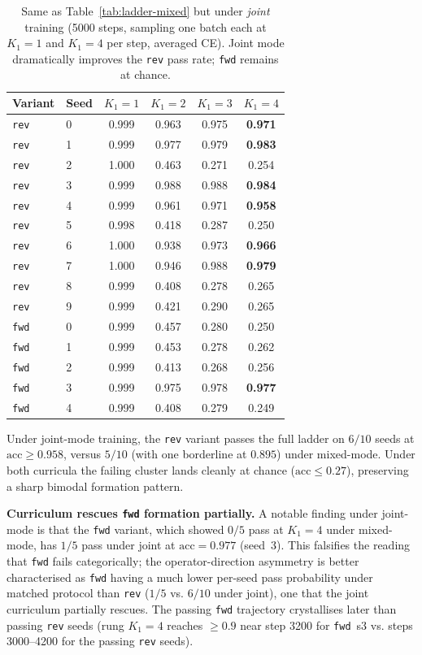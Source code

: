 \documentclass[11pt]{article}
\newcommand{\claim}[1]{#1}
\begin{document}
\begin{table}[h]
\centering
\caption{Same as Table~\ref{tab:ladder-mixed} but under \emph{joint}
training (5000 steps, sampling one batch each at $K_1{=}1$ and $K_1{=}4$
per step, averaged CE). Joint mode dramatically improves the \texttt{rev}
pass rate; \texttt{fwd} remains at chance.}
\label{tab:ladder-joint}
\begin{tabular}{llcccc}
\toprule
Variant & Seed & $K_1 = 1$ & $K_1 = 2$ & $K_1 = 3$ & $K_1 = 4$ \\
\midrule
\texttt{rev} & 0 & 0.999 & 0.963 & 0.975 & \textbf{0.971} \\
\texttt{rev} & 1 & 0.999 & 0.977 & 0.979 & \textbf{0.983} \\
\texttt{rev} & 2 & 1.000 & 0.463 & 0.271 & 0.254 \\
\texttt{rev} & 3 & 0.999 & 0.988 & 0.988 & \textbf{0.984} \\
\texttt{rev} & 4 & 0.999 & 0.961 & 0.971 & \textbf{0.958} \\
\texttt{rev} & 5 & 0.998 & 0.418 & 0.287 & 0.250 \\
\texttt{rev} & 6 & 1.000 & 0.938 & 0.973 & \textbf{0.966} \\
\texttt{rev} & 7 & 1.000 & 0.946 & 0.988 & \textbf{0.979} \\
\texttt{rev} & 8 & 0.999 & 0.408 & 0.278 & 0.265 \\
\texttt{rev} & 9 & 0.999 & 0.421 & 0.290 & 0.265 \\
\midrule
\texttt{fwd} & 0 & 0.999 & 0.457 & 0.280 & 0.250 \\
\texttt{fwd} & 1 & 0.999 & 0.453 & 0.278 & 0.262 \\
\texttt{fwd} & 2 & 0.999 & 0.413 & 0.268 & 0.256 \\
\texttt{fwd} & 3 & 0.999 & 0.975 & 0.978 & \textbf{0.977} \\
\texttt{fwd} & 4 & 0.999 & 0.408 & 0.279 & 0.249 \\
\bottomrule
\end{tabular}
\end{table}

Under joint-mode training, the \texttt{rev} variant passes the full
ladder on \claim{$6/10$} seeds at $\text{acc} \geq 0.958$, versus
$5/10$ (with one borderline at $0.895$) under mixed-mode. Under both
curricula the failing cluster lands cleanly at chance ($\text{acc}
\leq 0.27$), preserving a sharp bimodal formation pattern.

\textbf{Curriculum rescues \texttt{fwd} formation partially.} A
notable finding under joint-mode is that the \texttt{fwd} variant,
which showed $0/5$ pass at $K_1=4$ under mixed-mode, has \claim{$1/5$}
pass under joint at $\text{acc} = 0.977$ (seed~3). This falsifies the
reading that \texttt{fwd} fails categorically; the operator-direction
asymmetry is better characterised as \texttt{fwd} having a much lower
per-seed pass probability under matched protocol than \texttt{rev}
($1/5$ vs. $6/10$ under joint), one that the joint curriculum
partially rescues. The passing \texttt{fwd} trajectory crystallises
later than passing \texttt{rev} seeds (rung $K_1{=}4$ reaches
$\geq 0.9$ near step 3200 for \texttt{fwd}~s3 vs. steps 3000--4200
for the passing \texttt{rev} seeds).
\end{document}
